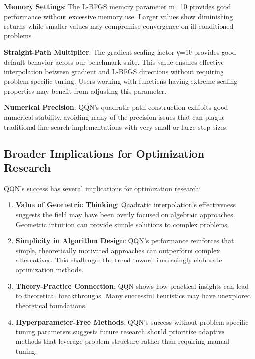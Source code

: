 \textbf{Memory Settings}: The L-BFGS memory parameter m=10 provides good performance without excessive memory use. Larger values show diminishing returns while smaller values may compromise convergence on ill-conditioned problems.

\textbf{Straight-Path Multiplier}: The gradient scaling factor γ=10 provides good default behavior across our benchmark suite. This value ensures effective interpolation between gradient and L-BFGS directions without requiring problem-specific tuning. Users working with functions having extreme scaling properties may benefit from adjusting this parameter.

\textbf{Numerical Precision}: QQN's quadratic path construction exhibits good numerical stability, avoiding many of the precision issues that can plague traditional line search implementations with very small or large step sizes.

\hypertarget{broader-implications-for-optimization-research}{%
\subsection{Broader Implications for Optimization Research}\label{broader-implications-for-optimization-research}}

QQN's success has several implications for optimization research:

\begin{enumerate}
\def\labelenumi{\arabic{enumi}.}
\item
  \textbf{Value of Geometric Thinking}: Quadratic interpolation's effectiveness suggests the field may have been overly focused on algebraic approaches. Geometric intuition can provide simple solutions to complex problems.
\item
  \textbf{Simplicity in Algorithm Design}: QQN's performance reinforces that simple, theoretically motivated approaches can outperform complex alternatives. This challenges the trend toward increasingly elaborate optimization methods.
\item
  \textbf{Theory-Practice Connection}: QQN shows how practical insights can lead to theoretical breakthroughs. Many successful heuristics may have unexplored theoretical foundations.
\item
  \textbf{Hyperparameter-Free Methods}: QQN's success without problem-specific tuning parameters suggests future research should prioritize adaptive methods that leverage problem structure rather than requiring manual tuning.
\end{enumerate}

